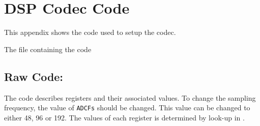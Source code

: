 \section{DSP Codec Code}\label{sec:codecsetup}

This appendix shows the code used to setup the codec.

The file containing the code  
\subsection{Raw Code:}

The code describes registers and their associated values. To change the sampling frequency, the value of \verb|ADCFs| should be changed. This value can be changed to either 48, 96 or 192. The values of each register is determined by look-up in .



